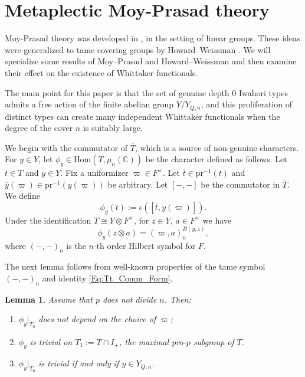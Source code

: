 \documentclass[11pt]{amsart}
\theoremstyle{plain}
\newtheorem{Lem}[equation]{Lemma}
\theoremstyle{definition}
\numberwithin{equation}{section}
\newcommand{\C}{\mathbb{C}}
\newcommand{\Tt}{\overline{T}}
\newcommand{\Yt}{Y_{Q,n}}
\newcommand{\ttt}{\overline{t}}
\newcommand{\yt}{\overline{y}}
\begin{document}
\section{Metaplectic Moy-Prasad theory}

Moy-Prasad theory was developed in \cite{MP94,MP94}, in the setting of linear groups. These ideas were generalized to tame covering groups by Howard--Weissman \cite{HW09}. We will specialize some results of Moy--Prasad and Howard--Weissman and then examine their effect on the existence of Whittaker functionals. 

The main point for this paper is that the set of genuine depth $0$ Iwahori types admits a free action of the finite abelian group $Y/\Yt$, and this proliferation of distinct types can create many independent Whittaker functionals when the degree of the cover $n$ is suitably large. 

We begin with the commutator of $\Tt$, which is a source of non-genuine characters. For $y\in Y$, let $\phi_{y}\in \mathrm{Hom}(T,\mu_{n}(\C))$ be the character defined as follows. Let $t\in T$ and $y\in Y$. Fix a uniformizer $\varpi\in F^{\times}$. Let $\ttt\in \mathrm{pr}^{-1}(t)$ and $\yt(\varpi)\in \mathrm{pr}^{-1}(y(\varpi))$ be arbitrary. Let $[-,-]$ be the commutator in $\Tt$. We define
\begin{equation*}
    \phi_{y}(t):= \epsilon([\ttt,\yt(\varpi)]).
\end{equation*}
Under the identification $T\cong Y\otimes F^{\times}$, for $z\in Y$, $a\in F^{\times}$ we have
\begin{equation}\label{Eq:Tt_Comm_Form}
    \phi_{y}(z\otimes a) = (\varpi,a)_{n}^{B(y,z)},
\end{equation}
where $(-,-)_{n}$ is the $n$-th order Hilbert symbol for $F$.

The next lemma follows from well-known properties of the tame symbol $(-,-)_{n}$ and identity \eqref{Eq:Tt_Comm_Form}. 

\begin{Lem}\label{Lem:phi_y_props}
    Assume that $p$ does not divide $n$. Then:
    \begin{enumerate}
        \item\label{Lem:phi_y_props:1} $\phi_{y}|_{T_{0}}$ does not depend on the choice of $\varpi$;
        \item\label{Lem:phi_y_props:2} $\phi_{y}$ is trivial on $T_{1}:=T\cap I_{+}$, the maximal pro-$p$ subgroup of $T$.
        \item\label{Lem:phi_y_props:3} $\phi_{y}|_{T_{0}}$ is trivial if and only if $y\in \Yt$.
    \end{enumerate}
\end{Lem}
\end{document}
